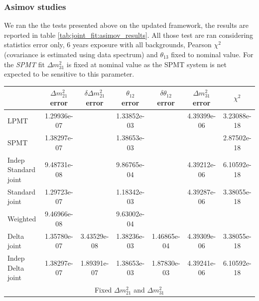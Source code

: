 \documentclass[../main.tex]{subfiles}
\begin{document}
\subsubsection{Asimov studies}

We ran the the tests presented above on the updated framework, the results are reported in table \ref{tab:joint_fit:asimov_results}. All those test are ran considering statistics error only, 6 years exposure with all backgrounds, Pearson $\chi^2$ (covariance is estimated using data spectrum) and $\theta_{13}$ fixed to nominal value. For the \textit{SPMT} fit $\Delta m^2_{31}$ is fixed at nominal value as the SPMT system is net expected to be sensitive to this parameter.

\begin{table}[ht]
  \begin{footnotesize}
  \centering
  \begin{tabular}{l | c | c | c | c | c | c }
                                    & $\Delta m^2_{21}$ error  & $\delta \Delta m^2_{21}$ error & $\theta_{12}$ error   & $\delta \theta_{12}$ error  & $\Delta m^2_{31}$ error & $\chi^2$ \\
                                    \hline
  LPMT                                 & 1.29936e-07   &               & 1.33852e-03   &               & 4.39399e-06   & 3.23088e-18 \\
  SPMT                                 & 1.38297e-07   &               & 1.38653e-03   &               &               & 2.87502e-18 \\
  Indep Standard joint                 & 9.48731e-08   &               & 9.86765e-04   &               & 4.39212e-06   & 6.10592e-18 \\
  Standard joint                       & 1.29723e-07   &               & 1.18342e-03   &               & 4.39287e-06   & 3.38055e-18 \\
  Weighted                             & 9.46966e-08   &               & 9.63002e-04   &               &               & \\
  \hline
  Delta joint                            & 1.35780e-07   & 3.43529e-08   & 1.38236e-03   & 1.46865e-04   & 4.39309e-06   & 3.38055e-18 \\
  Indep Delta joint                      & 1.38297e-07   & 1.89391e-07   & 1.38653e-03   & 1.87830e-03   & 4.39241e-06   & 6.10592e-18 \\
  \hline
  \hline
  \multicolumn{7}{c}{Fixed $\Delta m^2_{21}$ and $\Delta m^2_{31}$} \\

\end{tabular}
\end{footnotesize}
\end{table}
\end{document}

